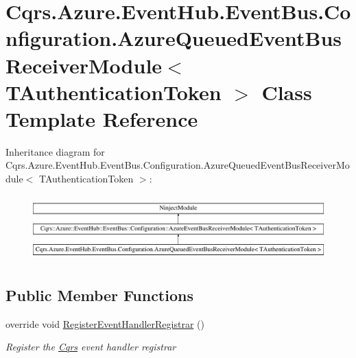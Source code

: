 \hypertarget{classCqrs_1_1Azure_1_1EventHub_1_1EventBus_1_1Configuration_1_1AzureQueuedEventBusReceiverModule}{}\section{Cqrs.\+Azure.\+Event\+Hub.\+Event\+Bus.\+Configuration.\+Azure\+Queued\+Event\+Bus\+Receiver\+Module$<$ T\+Authentication\+Token $>$ Class Template Reference}
\label{classCqrs_1_1Azure_1_1EventHub_1_1EventBus_1_1Configuration_1_1AzureQueuedEventBusReceiverModule}
Inheritance diagram for Cqrs.\+Azure.\+Event\+Hub.\+Event\+Bus.\+Configuration.\+Azure\+Queued\+Event\+Bus\+Receiver\+Module$<$ T\+Authentication\+Token $>$\+:\begin{figure}[H]
\begin{center}
\leavevmode
\includegraphics[height=2.568807cm]{classCqrs_1_1Azure_1_1EventHub_1_1EventBus_1_1Configuration_1_1AzureQueuedEventBusReceiverModule}
\end{center}
\end{figure}
\subsection*{Public Member Functions}
\begin{DoxyCompactItemize}
\item 
override void \hyperlink{classCqrs_1_1Azure_1_1EventHub_1_1EventBus_1_1Configuration_1_1AzureQueuedEventBusReceiverModule_a419dbe60e08be1bbf29b875cb1f121d0}{Register\+Event\+Handler\+Registrar} ()
\begin{DoxyCompactList}\small\item\em Register the \hyperlink{namespaceCqrs}{Cqrs} event handler registrar \end{DoxyCompactList}\end{DoxyCompactItemize}



